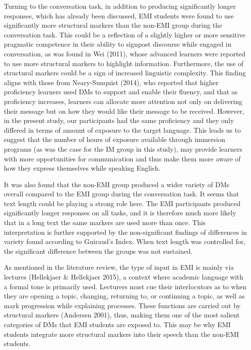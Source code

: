 \documentclass[12pt]{article}
\newenvironment{styleStandard}{\setlength\leftskip{0cm}\setlength\rightskip{0cm plus 1fil}\setlength\parindent{0cm}\setlength\parfillskip{0pt plus 1fil}\setlength\parskip{0in plus 1pt}\writerlistparindent\writerlistleftskip\leavevmode\normalfont\normalsize\writerlistlabel\ignorespaces}{\unskip\vspace{0.111in plus 0.0111in}\par}
\newcommand\writerlistleftskip{}
\newcommand\writerlistparindent{}
\newcommand\writerlistlabel{}
\begin{document}
\begin{styleStandard}
Turning to the conversation task, in addition to producing significantly longer responses, which has already been discussed, EMI students were found to use significantly more structural markers than the non-EMI group during the conversation task. This could be a reflection of a slightly higher or more sensitive pragmatic competence in their ability to signpost discourse while engaged in conversation, as was found in Wei (2011), whose advanced learners were reported to use more structural markers to highlight information. Furthermore, the use of structural markers could be a sign of increased linguistic complexity. This finding aligns with those from Neary-Sunquist (2014), who reported that higher proficiency learners used DMs to support and enable their fluency, and that as proficiency increases, learners can allocate more attention not only on delivering their message but on how they would like their message to be received. However, in the present study, our participants had the same proficiency and they only differed in terms of amount of exposure to the target language. This leads us to suggest that the number of hours of exposure available through immersion programs (as was the case for the IM group in this study), may provide learners with more opportunities for communication and thus make them more aware of how they express themselves while speaking English.
\end{styleStandard}

\begin{styleStandard}
It was also found that the non-EMI group produced a wider variety of DMs overall compared to the EMI group during the conversation task. It seems that text length could be playing a strong role here. The EMI participants produced significantly longer responses on all tasks, and it is therefore much more likely that in a long text the same markers are used more than once. This interpretation is further supported by the non-significant findings of differences in variety found according to Guiraud’s Index. When text length was controlled for, the significant difference between the groups was not sustained.
\end{styleStandard}

\begin{styleStandard}
As mentioned in the literature review, the type of input in EMI is mainly via lectures (Hellekjaer \& Hellekjaer 2015), a context where academic language with a formal tone is primarily used. Lecturers must cue their interlocutors as to when they are opening a topic, changing, returning to, or continuing a topic, as well as mark progression while explaining processes. These functions are carried out by structural markers (Andersen 2001), thus, making them one of the most salient categories of DMs that EMI students are exposed to. This may be why EMI students integrate more structural markers into their speech than the non-EMI students. 
\end{styleStandard}
\end{document}
